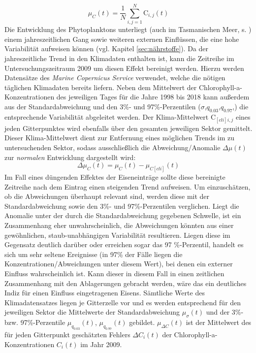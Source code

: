 \documentclass[12pt,a4paper,onecolumn]{scrartcl}
\begin{document}
\begin{equation}
\mu_C(t) = \frac{1}{N}\sum\limits_{i,j=1}^{N} \text{C}_{i,j}(t)
\end{equation}
Die Entwicklung des Phytoplanktons unterliegt (auch im Tasmanischen Meer, s. \citet{Tilburg.2002}) einem jahreszeitlichen Gang sowie weiteren externen Einflüssen, die eine hohe Variabilität aufweisen können (vgl. Kapitel \ref{sec:nährstoffe}). Da der jahreszeitliche Trend in den Klimadaten enthalten ist, kann die Zeitreihe im Untersuchungszeitraum 2009 um diesen Effekt bereinigt werden. Hierzu werden Datensätze des \textit{Marine Copernicus Service} verwendet, welche die nötigen täglichen Klimadaten bereits liefern. Neben dem Mittelwert der Chlorophyll-a-Konzentrationen des jeweiligen Tages für die Jahre 1998 bis 2018 kann außerdem aus der Standardabweichung und den 3\%- und 97\%-Perzentilen ($\sigma$,$q_{0.03}$,$q_{0.97}$,) die entsprechende Variabilität abgeleitet werden. Der Klima-Mittelwert $\text{C}_{[cli]i,j}$ eines jeden Gitterpunktes wird ebenfalls über den gesamten jeweiligen Sektor gemittelt. Dieser Klima-Mittelwert dient zur Entfernung eines möglichen Trends im zu untersuchenden Sektor, sodass ausschließlich die Abweichung/Anomalie $\Delta \mu(t)$ zur \textit{normalen} Entwicklung dargestellt wird:
\begin{equation}
\Delta \mu_C(t) = \mu_C(t) - \mu_{C[cli]}(t) \label{eq:cli_anomalie}
\end{equation} 
Im Fall eines düngenden Effektes der Eiseneinträge sollte diese bereinigte Zeitreihe nach dem Eintrag einen steigenden Trend aufweisen. Um einzuschätzen, ob die Abweichungen überhaupt relevant sind, werden diese mit der Standardabweichung sowie den 3\%- und 97\%-Perzentilen verglichen. Liegt die Anomalie unter der durch die Standardabweichung gegebenen Schwelle, ist ein Zusammenhang eher unwahrscheinlich, die Abweichungen könnten aus einer gewöhnlichen, staub-unabhängigen Variabilität resultieren. Liegen diese im Gegensatz deutlich darüber oder erreichen sogar das 97 \%-Perzentil, handelt es sich um sehr seltene Ereignisse (in 97\% der Fälle liegen die Konzentrationen/Abweichungen unter diesem Wert), bei denen ein externer Einfluss wahrscheinlich ist. Kann dieser in diesem Fall in einen zeitlichen Zusammenhang mit den Ablagerungen gebracht werden, wäre das ein deutliches Indiz für einen Einfluss eingetragenen Eisens. Sämtliche Werte des Klimadatensatzes liegen je Gitterzelle vor und es werden entsprechend für den jeweiligen Sektor die Mittelwerte der Standardabweichung $\mu_\sigma (t)$ und der 3\%- bzw. 97\%-Perzentile  $\mu_{q_{0.03}}(t)$, $\mu_{q_{0.97}}(t)$ gebildet. $\mu_{\Delta C}(t)$ ist der Mittelwert des für jeden Gitterpunkt geschätzten Fehlers $ \Delta C_i(t)$ der Chlorophyll-a-Konzentrationen $C_i(t)$ im Jahr 2009.
\end{document}

